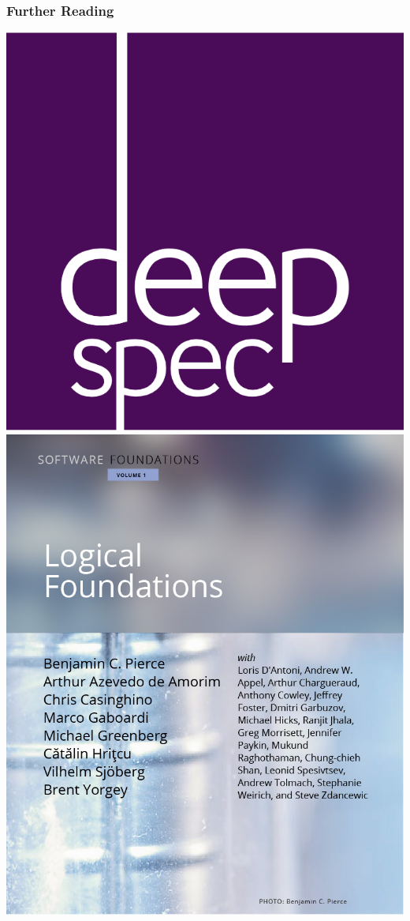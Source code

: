\documentclass[usenames,dvipsnames]{beamer}
\begin{document}
\begin{frame}
\frametitle{Further Reading}
\includegraphics[width=0.4\paperwidth]{deepspec}
\hspace{2em}
\includegraphics[width=0.4\paperwidth]{sf}
\end{frame}
\end{document}
